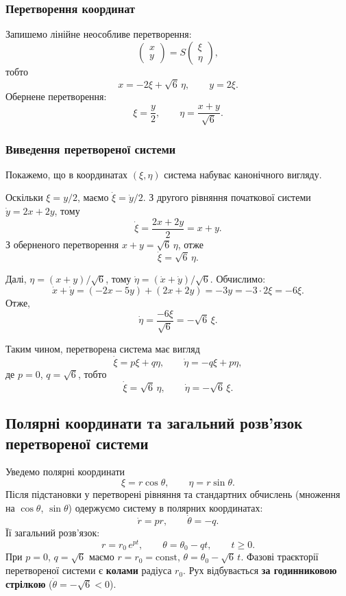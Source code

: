 \documentclass[12pt,a4paper]{article}
\begin{document}
\subsubsection{Перетворення координат}

Запишемо лінійне неособливе перетворення:
\[
\begin{pmatrix}
x\\y
\end{pmatrix}
= S
\begin{pmatrix}
\xi\\\eta
\end{pmatrix},
\]
тобто
\[
x = -2\xi + \sqrt{6}\,\eta, \qquad y = 2\xi.
\]
Обернене перетворення:
\[
\xi = \frac{y}{2}, \qquad \eta = \frac{x + y}{\sqrt{6}}.
\]

\subsubsection{Виведення перетвореної системи}

Покажемо, що в координатах $(\xi,\eta)$ система набуває канонічного вигляду.

Оскільки $\xi = y/2$, маємо $\dot{\xi} = \dot{y}/2$. З другого рівняння початкової системи $\dot{y} = 2x + 2y$, тому
\[
\dot{\xi} = \frac{2x + 2y}{2} = x + y.
\]
З оберненого перетворення $x + y = \sqrt{6}\,\eta$, отже
\[
\dot{\xi} = \sqrt{6}\,\eta.
\]

Далі, $\eta = (x+y)/\sqrt{6}$, тому $\dot{\eta} = (\dot{x} + \dot{y})/\sqrt{6}$. Обчислимо:
\[
\dot{x} + \dot{y} = (-2x - 5y) + (2x + 2y) = -3y = -3 \cdot 2\xi = -6\xi.
\]
Отже,
\[
\dot{\eta} = \frac{-6\xi}{\sqrt{6}} = -\sqrt{6}\,\xi.
\]

Таким чином, перетворена система має вигляд
\[
\dot{\xi} = p\xi + q\eta, \qquad \dot{\eta} = -q\xi + p\eta,
\]
де $p = 0$, $q = \sqrt{6}$, тобто
\[
\dot{\xi} = \sqrt{6}\,\eta, \qquad \dot{\eta} = -\sqrt{6}\,\xi.
\]

\subsection{Полярні координати та загальний розв'язок перетвореної системи}

Уведемо полярні координати
\[
\xi = r\cos\theta, \qquad \eta = r\sin\theta.
\]
Після підстановки у перетворені рівняння та стандартних обчислень (множення на $\cos\theta$, $\sin\theta$) одержуємо систему в полярних координатах:
\[
\dot{r} = pr, \qquad \dot{\theta} = -q.
\]
Її загальний розв'язок:
\[
r = r_0\,e^{pt}, \qquad \theta = \theta_0 - qt, \qquad t \geq 0.
\]
При $p = 0$, $q = \sqrt{6}$ маємо $r = r_0 = \mathrm{const}$, $\theta = \theta_0 - \sqrt{6}\,t$. Фазові траєкторії перетвореної системи є \textbf{колами} радіуса $r_0$. Рух відбувається \textbf{за годинниковою стрілкою} ($\dot\theta = -\sqrt{6} < 0$).
\end{document}
